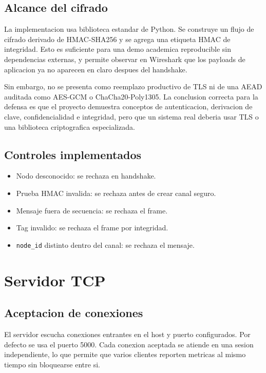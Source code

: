 \documentclass[11pt,letterpaper]{article}
\begin{document}
\subsection{Alcance del cifrado}

La implementacion usa biblioteca estandar de Python. Se construye un flujo de
cifrado derivado de HMAC-SHA256 y se agrega una etiqueta HMAC de integridad. Esto
es suficiente para una demo academica reproducible sin dependencias externas, y
permite observar en Wireshark que los payloads de aplicacion ya no aparecen en
claro despues del handshake.

Sin embargo, no se presenta como reemplazo productivo de TLS ni de una AEAD
auditada como AES-GCM o ChaCha20-Poly1305. La conclusion correcta para la defensa
es que el proyecto demuestra conceptos de autenticacion, derivacion de clave,
confidencialidad e integridad, pero que un sistema real deberia usar TLS o una
biblioteca criptografica especializada.

\subsection{Controles implementados}

\begin{itemize}
  \item Nodo desconocido: se rechaza en handshake.
  \item Prueba HMAC invalida: se rechaza antes de crear canal seguro.
  \item Mensaje fuera de secuencia: se rechaza el frame.
  \item Tag invalido: se rechaza el frame por integridad.
  \item \texttt{node\_id} distinto dentro del canal: se rechaza el mensaje.
\end{itemize}

\newpage
\section{Servidor TCP}

\subsection{Aceptacion de conexiones}

El servidor escucha conexiones entrantes en el host y puerto configurados. Por
defecto se usa el puerto 5000. Cada conexion aceptada se atiende en una sesion
independiente, lo que permite que varios clientes reporten metricas al mismo
tiempo sin bloquearse entre si.
\end{document}
